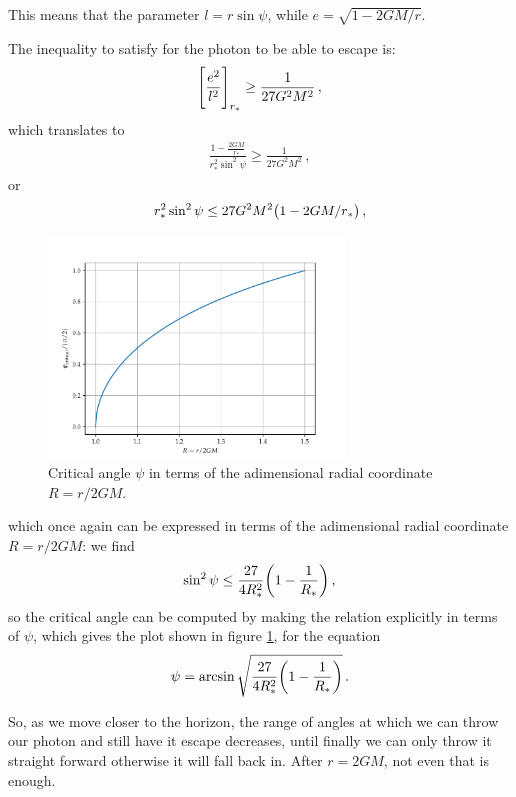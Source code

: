 \documentclass[main.tex]{subfiles}
\begin{document}
This means that the parameter \(l = r \sin \psi \), while \(e = \sqrt{1-2GM/r}\). 

The inequality to satisfy for the photon to be able to escape is: 
%
\begin{align}
  \qty[\frac{e^2}{l^2}]_{r_{*}} \geq \frac{1}{27G^2M^2}
\,,
\end{align}
%
which translates to 
%
\begin{align}
  \frac{1 - \frac{2GM}{r_{*}}}{r_{*}^2 \sin^2 \psi } \geq \frac{1}{27G^2M^2}
\,,
\end{align}
%
or 
%
\begin{align}
  r_{*}^2 \sin^2 \psi \leq 27G^2M^2 \qty(1 - 2GM/r_{*}) 
  \,,
\end{align}
%
\begin{figure}[ht]
  \centering
  \includegraphics[width=0.7\textwidth]{figures/critical_psi.pdf}
  \caption{Critical angle \(\psi \) in terms of the adimensional radial coordinate \(R = r/ 2GM\).}
  \label{fig:critical-psi}
\end{figure}
%
which once again can be expressed in terms of the adimensional radial coordinate \(R = r/2GM\): we find 
%
\begin{align}
  \sin^2 \psi \leq \frac{27}{4 R_{*}^2} \qty(1 - \frac{1}{R_{*}})
  \,,
\end{align}
%
so the critical angle can be computed by making the relation explicitly in terms of \(\psi \), which gives the plot shown in figure \ref{fig:critical-psi}, for the equation 
%
\begin{align}
  \psi = \arcsin \sqrt{\frac{27}{4 R_{*}^2} \qty(1 - \frac{1}{R_{*}})}
\,.
\end{align}
%

So, as we move closer to the horizon, the range of angles at which we can throw our photon and still have it escape decreases, until finally we can only throw it straight forward otherwise it will fall back in. After \(r = 2GM\), not even that is enough.  
\end{document}
